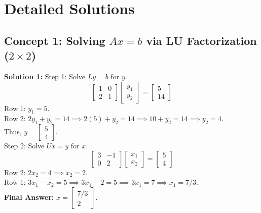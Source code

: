 \documentclass[11pt]{article}
\begin{document}
\section{Detailed Solutions}

\subsection*{Concept 1: Solving $Ax = b$ via LU Factorization ($2 \times 2$)}

\textbf{Solution 1:}
Step 1: Solve $Ly = b$ for $y$.
$$ \begin{bmatrix} 1 & 0 \\ 2 & 1 \end{bmatrix} \begin{bmatrix} y_1 \\ y_2 \end{bmatrix} = \begin{bmatrix} 5 \\ 14 \end{bmatrix} $$
Row 1: $y_1 = 5$. \\
Row 2: $2y_1 + y_2 = 14 \implies 2(5) + y_2 = 14 \implies 10 + y_2 = 14 \implies y_2 = 4$. \\
Thus, $y = \begin{bmatrix} 5 \\ 4 \end{bmatrix}$. \\
Step 2: Solve $Ux = y$ for $x$.
$$ \begin{bmatrix} 3 & -1 \\ 0 & 2 \end{bmatrix} \begin{bmatrix} x_1 \\ x_2 \end{bmatrix} = \begin{bmatrix} 5 \\ 4 \end{bmatrix} $$
Row 2: $2x_2 = 4 \implies x_2 = 2$. \\
Row 1: $3x_1 - x_2 = 5 \implies 3x_1 - 2 = 5 \implies 3x_1 = 7 \implies x_1 = 7/3$. \\
\textbf{Final Answer:} $x = \begin{bmatrix} 7/3 \\ 2 \end{bmatrix}$.
\end{document}
